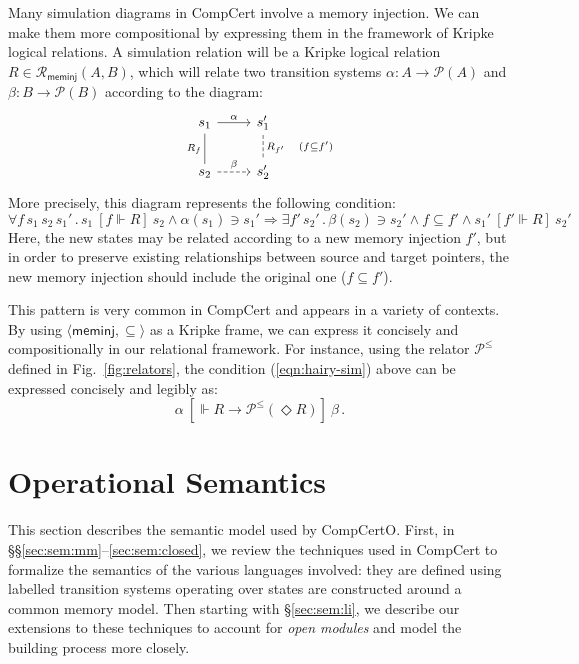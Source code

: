\documentclass[sigplan,10pt,review,anonymous]{acmart}
\newcommand{\kw}[1]{\ensuremath{ \mathsf{#1} }}
\newcommand{\ifr}[1]{\ [{#1}]\ }
\begin{document}
\begin{example} \label{ex:sim} %
Many simulation diagrams in CompCert
involve a memory injection.
We can make them more compositional by
expressing them in the framework of Kripke logical relations.
A simulation relation will be a Kripke logical relation
$R \in \mathcal{R}_\kw{meminj}(A, B)$,
which will relate two transition systems
$\alpha : A \rightarrow \mathcal{P}(A)$ and
$\beta : B \rightarrow \mathcal{P}(B)$
according to the diagram:
\[
  \begin{tikzcd}
    s_1 \arrow[r, "\alpha"]
        \arrow[d, dash, "R_f"'] &
    s_1' \arrow[d, dashed, dash, "R_{f'} \quad (f \subseteq f')"] \\
    s_2 \arrow[r, dashed, "\beta"] &
    s_2'
  \end{tikzcd}
\]
More precisely, this diagram represents the following condition:
\begin{equation}
    \label{eqn:hairy-sim}
    \forall f \, s_1 \, s_2 \, s_1' \,.\,
      s_1 \ifr{f \Vdash R} s_2 \wedge
      \alpha(s_1) \ni s_1' \Rightarrow
    \exists f' \, s_2' \,.\,
      \beta(s_2) \ni s_2' \wedge
      f \subseteq f' \wedge
      s_1' \ifr{f' \Vdash R} s_2'
\end{equation}
Here, the new states may be related according to
a new memory injection $f'$,
but in order to preserve existing relationships
between source and target pointers,
the new memory injection should include
the original one ($f \subseteq f'$).

This pattern is very common in CompCert
and appears in a variety of contexts.
By using $\langle \kw{meminj}, {\subseteq} \rangle$
as a Kripke frame,
we can express it concisely and compositionally
in our relational framework.
For instance,
using the relator $\mathcal{P}^\le$ defined in
Fig.~\ref{fig:relators},
the condition (\ref{eqn:hairy-sim}) above can be expressed
concisely and legibly as:
\[
  \alpha \ifr{\Vdash R \rightarrow \mathcal{P}^\le(\Diamond R)} \beta \,.
\]
\end{example}



\cbstart
\section{Operational Semantics} \label{sec:compcert} %

This section describes the semantic model used by CompCertO.
First, in \S\S\ref{sec:sem:mm}--\ref{sec:sem:closed},
we review the techniques used in CompCert
to formalize the semantics of the various languages involved:
they are defined using labelled transition systems
operating over states are constructed around
a common memory model.
Then starting with \S\ref{sec:sem:li},
we describe our extensions to these techniques
to account for \emph{open modules}
and model the building process more closely.
\end{document}
